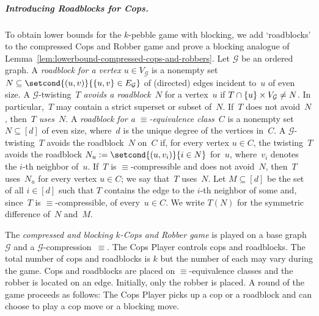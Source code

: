 \documentclass[a4paper,english, thm-restate]{lipics-v2021}
\newcommand{\defining}[1]{\emph{#1}}
\DeclarePairedDelimiter\set{\lbrace}{\rbrace}
\newcommand{\comp}{\equiv}
\newcommand{\graphG}{\mathcal{G}}
\newcommand{\vertexG}{V_{\graphG}}
\newcommand{\edgeG}{E_{\graphG}}
\begin{document}
\subparagraph*{Introducing Roadblocks for Cops.}
To obtain lower bounds for the $k$-pebble game with blocking,
we add `roadblocks' to the compressed Cops and Robber game
and prove a blocking  analogue of Lemma~\ref{lem:lowerbound-compressed-cops-and-robbers}.
Let $\graphG$ be an ordered graph.
A \defining{roadblock for a vertex} $u \in \vertexG$
is a nonempty set $N \subseteq \setcond{(u,v)}{\set{u,v} \in \edgeG}$ of (directed) edges incident to~$u$ of even size.
A $\graphG$-twisting~$T$ \defining{avoids a roadblock}~$N$ for a vertex~$u$
if $T\cap \set{u}\times \vertexG \neq N$.
In particular,~$T$ may contain a strict superset or subset of~$N$.
If~$T$ does not avoid~$N$, then~$T$ \defining{uses}~$N$. 
A \defining{roadblock for a $\comp$-equivalence class}~$C$ is a nonempty 
set~$N \subseteq [d]$ of even size, where~$d$ is the unique degree of the vertices in~$C$.
A $\graphG$-twisting~$T$ avoids the roadblock~$N$ on~$C$
if, for every vertex $u \in C$, 
the twisting~$T$ avoids the roadblock
$N_u := \setcond{(u,v_i)}{i \in N}$ for~$u$, where~$v_i$ denotes the $i$-th neighbor of~$u$.
If~$T$ is $\comp$-compressible and does not avoid~$N$,
then~$T$ uses~$N_u$ for every vertex $u \in C$;
we say that~$T$ uses~$N$.
Let $M \subseteq [d]$ be the set of all $i \in [d]$ such that $T$ contains the edge to the $i$-th neighbor of some and, since~$T$ is $\comp$-compressible, of every~$u \in C$.
We write $T(N)$ for the symmetric difference of~$N$ and~$M$.


The \defining{compressed and blocking $k$-Cops and Robber game}
is played on a base graph~$\graphG$ and a $\graphG$-compression~$\comp$.
The Cops Player controls cops and roadblocks.
The total number of cops and roadblocks is $k$ but the number of each may vary during the game.
Cops and roadblocks are placed on $\comp$-equivalence classes
and the robber is located on an edge.
Initially, only the robber is placed.
A round of the game proceeds as follows:
The Cops Player picks up a cop or a roadblock and can choose to play a cop move or a blocking move.
\end{document}
